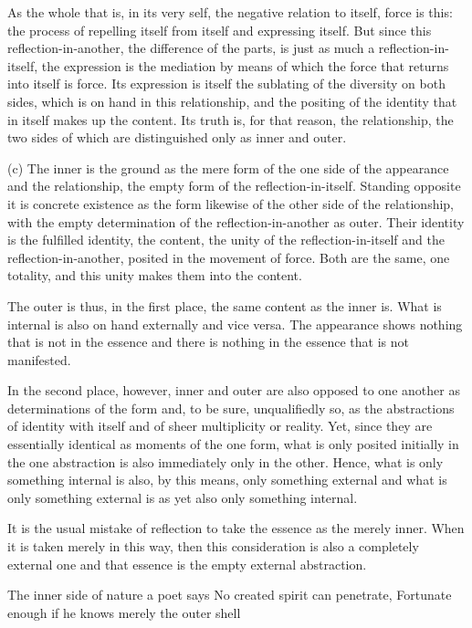 As the whole that is, in its very self,
the negative relation to itself, force is this:
the process of repelling itself from itself
and expressing itself.
But since this reflection-in-another,
the difference of the parts,
is just as much a reflection-in-itself,
the expression is the mediation by means of which
the force that returns into itself is force.
Its expression is itself the sublating of
the diversity on both sides,
which is on hand in this relationship,
and the positing of the identity
that in itself makes up the content.
Its truth is, for that reason, the relationship,
the two sides of which are distinguished only as inner and outer.

(c) The inner is the ground as the mere form
of the one side of the appearance and the relationship,
the empty form of the reflection-in-itself.
Standing opposite it is concrete existence as the form likewise
of the other side of the relationship,
with the empty determination of the
reflection-in-another as outer.
Their identity is the fulfilled identity, the content,
the unity of the reflection-in-itself and
the reflection-in-another,
posited in the movement of force.
Both are the same, one totality,
and this unity makes them into the content.

The outer is thus, in the first place, the same content as the inner is.
What is internal is also on hand externally and vice versa.
The appearance shows nothing that is not in the essence and
there is nothing in the essence that is not manifested.

In the second place, however,
inner and outer are also opposed to one another
as determinations of the form
and, to be sure, unqualifiedly so,
as the abstractions of identity with itself
and of sheer multiplicity or reality.
Yet, since they are essentially identical
as moments of the one form,
what is only posited initially
in the one abstraction is
also immediately only in the other.
Hence, what is only something internal is
also, by this means, only something external
and what is only something external is
as yet also only something internal.

    It is the usual mistake of reflection
    to take the essence as the merely inner.
    When it is taken merely in this way,
    then this consideration is
    also a completely external one
    and that essence is the empty external abstraction.

        The inner side of nature a poet says
        No created spirit can penetrate,
        Fortunate enough if he knows merely the outer shell

